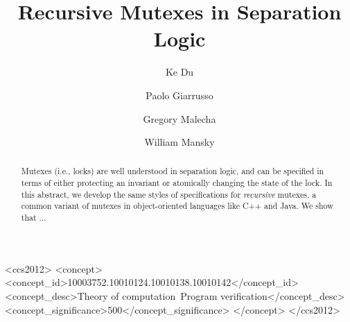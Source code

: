 \documentclass[sigplan,screen]{acmart}
\begin{document}
\title{Recursive Mutexes in Separation Logic}

\author{Ke Du}

\author{Paolo Giarrusso}

\author{Gregory Malecha}

\author{William Mansky}

\renewcommand{\shortauthors}{Du et al.}

\newcommand{\mutexR}{\ensuremath{\mathsf{rmutex}}}

\begin{abstract}
Mutexes (i.e., locks) are well understood in separation logic, and can be specified in terms of either protecting an invariant or atomically changing the state of the lock. In this abstract, we develop the same styles of specifications for \emph{recursive} mutexes, a common variant of mutexes in object-oriented languages like C++ and Java. We show that ...
\end{abstract}

\begin{CCSXML}
<ccs2012>
<concept>
<concept_id>10003752.10010124.10010138.10010142</concept_id>
<concept_desc>Theory of computation~Program verification</concept_desc>
<concept_significance>500</concept_significance>
</concept>
</ccs2012>
\end{CCSXML}
\end{document}
